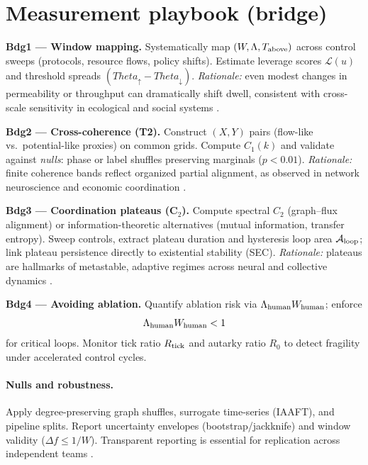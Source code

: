 \documentclass[12pt,a4paper,oneside]{scrreprt}
\def\Theta{Theta}%
\begin{document}
\section{Measurement playbook (bridge)}\label{sec:bridge-playbook}

\textbf{Bdg1 — Window mapping.}  
Systematically map $(W,\Lambda,T_{\rm above})$ across control sweeps (protocols, resource flows, policy shifts). Estimate leverage scores $\mathcal L(u)$ and threshold spreads $(\Theta_\uparrow-\Theta_\downarrow)$.  
\emph{Rationale:} even modest changes in permeability or throughput can dramatically shift dwell, consistent with cross-scale sensitivity in ecological and social systems \cite{Levin1998, Ostrom2009}.

\textbf{Bdg2 — Cross-coherence (T2).}  
Construct $(X,Y)$ pairs (flow-like vs.\ potential-like proxies) on common grids. Compute $C_1(k)$ and validate against \emph{nulls}: phase or label shuffles preserving marginals ($p<0.01$).  
\emph{Rationale:} finite coherence bands reflect organized partial alignment, as observed in network neuroscience and economic coordination \cite{Bullmore2009, Haldane2011}.

\textbf{Bdg3 — Coordination plateaus (C$_2$).}  
Compute spectral $C_2$ (graph–flux alignment) or information-theoretic alternatives (mutual information, transfer entropy). Sweep controls, extract plateau duration and hysteresis loop area $\mathcal A_{\rm loop}$; link plateau persistence directly to existential stability (SEC).  
\emph{Rationale:} plateaus are hallmarks of metastable, adaptive regimes across neural and collective dynamics \cite{Tognoli2014, Friston2017}.

\textbf{Bdg4 — Avoiding ablation.}  
Quantify ablation risk via $\Lambda_{\rm human} W_{\rm human}$; enforce  
\[
\Lambda_{\rm human} W_{\rm human}<1
\] 
for critical loops. Monitor tick ratio $R_{\rm tick}$ and autarky ratio $R_0$ to detect fragility under accelerated control cycles.

\paragraph{Nulls and robustness.}  
Apply degree-preserving graph shuffles, surrogate time-series (IAAFT), and pipeline splits. Report uncertainty envelopes (bootstrap/jackknife) and window validity ($\Delta f\le 1/W$). Transparent reporting is essential for replication across independent teams \cite{OpenScience2015}.
\end{document}
